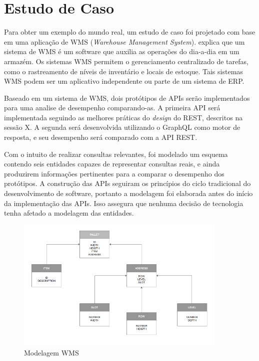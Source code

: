 \chapter[Estudo de Caso]{Estudo de Caso}

Para obter um exemplo do mundo real, um estudo de caso foi projetado com base em uma aplicação de WMS (\textit{Warehouse Management System}).  explica que um sistema de WMS é um software que auxilia as operações do dia-a-dia em um armazém. Os sistemas WMS permitem o gerenciamento centralizado de tarefas, como o rastreamento de níveis de inventário e locais de estoque. Tais sistemas WMS podem ser  um aplicativo independente ou parte de um sistema de ERP.

Baseado em um sistema de WMS, dois protótipos de APIs serão implementados para uma analise de desempenho comparando-as. A primeira API será implementada seguindo as melhores práticas do \textit{design} do REST, descritos na sessão X. A segunda será desenvolvida utilizando o GraphQL como motor de resposta, e seu desempenho será comparado com a API REST.

Com o intuito de realizar consultas relevantes, foi modelado um esquema contendo seis entidades capazes de representar consultas reais, e ainda produzirem informações pertinentes para a comparar o desempenho dos protótipos. A construção das APIs seguiram os princípios do ciclo tradicional do desenvolvimento de software, portanto a modelagem foi elaborada antes do início da implementação das APIs. Isso assegura que nenhuma decisão de tecnologia tenha afetado a modelagem das entidades.

\begin{figure}[htbp]
\centering
\includegraphics[width=0.9\textwidth]{figuras/model.png}
\caption{Modelagem WMS}
\label{fig:modelagem}
\author{fonte: Autor}
\end{figure}

